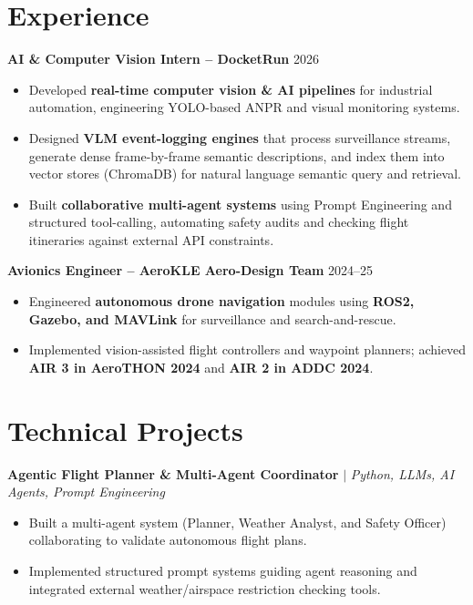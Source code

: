 \documentclass[a4paper,11pt]{article}
\begin{document}
\section*{\color{linkblue}Experience}
\small
\vspace{2pt}
\textbf{\color{secondary}AI \& Computer Vision Intern -- DocketRun} \hfill 2026
\begin{itemize}
    \item Developed \textbf{real-time computer vision \& AI pipelines} for industrial automation, engineering YOLO-based ANPR and visual monitoring systems.
    \item Designed \textbf{VLM event-logging engines} that process surveillance streams, generate dense frame-by-frame semantic descriptions, and index them into vector stores (ChromaDB) for natural language semantic query and retrieval.
    \item Built \textbf{collaborative multi-agent systems} using Prompt Engineering and structured tool-calling, automating safety audits and checking flight itineraries against external API constraints.
\end{itemize}

\vspace{4pt}
\textbf{\color{secondary}Avionics Engineer -- AeroKLE Aero-Design Team} \hfill 2024--25
\begin{itemize}
    \item Engineered \textbf{autonomous drone navigation} modules using \textbf{ROS2, Gazebo, and MAVLink} for surveillance and search-and-rescue.
    \item Implemented vision-assisted flight controllers and waypoint planners; achieved \textbf{AIR 3 in AeroTHON 2024} and \textbf{AIR 2 in ADDC 2024}.
\end{itemize}
\vspace{3pt}

\section*{\color{linkblue}Technical Projects}
\small
\vspace{2pt}

\textbf{\color{secondary}Agentic Flight Planner \& Multi-Agent Coordinator} $|$ \textit{Python, LLMs, AI Agents, Prompt Engineering} \hfill \href{https://github.com/Arihant3704/aerial-image/tree/main/ai_projects/agentic_flight_planner}{\color{linkblue}\faGithub}
\begin{itemize}
    \item Built a multi-agent system (Planner, Weather Analyst, and Safety Officer) collaborating to validate autonomous flight plans.
    \item Implemented structured prompt systems guiding agent reasoning and integrated external weather/airspace restriction checking tools.
\end{itemize}
\end{document}
